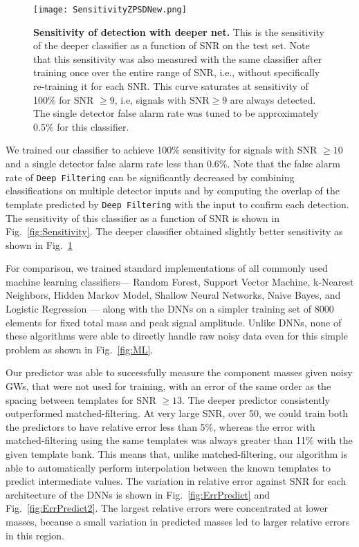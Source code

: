 \documentclass[aps,prd,%
amsmath,floats,floatfix, twocolumn, superscriptaddress,nofootinbib,showpacs]{revtex4-1}
\begin{document}
\begin{figure}
	
	\hspace{-.25in}	\texttt{[image: SensitivityZPSDNew.png]}
	
	\caption{\textbf{Sensitivity of detection with deeper net.} This is the sensitivity of the deeper classifier as a function of SNR on the test set. Note that this sensitivity was also measured with the same classifier after training once over the entire range of SNR, i.e., without specifically re-training it for each SNR. This curve saturates at sensitivity of 100\% for SNR $\ge 9$, i.e, signals with \(\textrm{SNR} \geq 9\) are always detected. The single detector false alarm rate was tuned to be approximately 0.5\% for this classifier. }
	\label{fig:SensitivityNew}
\end{figure}

We trained our classifier to achieve 100\% sensitivity for signals with SNR $\geq 10$ and a single detector false alarm rate less than 0.6\%. Note that the false alarm rate of \texttt{Deep Filtering} can be significantly decreased by combining classifications on multiple detector inputs and by computing the overlap of the template predicted by \texttt{Deep Filtering} with the input to confirm each detection. The sensitivity of this classifier as a function of SNR is shown in Fig.~\ref{fig:Sensitivity}. The deeper classifier obtained slightly better sensitivity as shown in Fig.~\ref{fig:SensitivityNew}


\noindent For comparison, we trained standard implementations of all commonly used machine learning classifiers--- Random Forest, Support Vector Machine, k-Nearest Neighbors, Hidden Markov Model, Shallow Neural Networks, Naive Bayes, and Logistic Regression --- along with the DNNs on a simpler training set of 8000 elements for fixed total mass and peak signal amplitude. Unlike DNNs, none of these algorithms were able to directly handle raw noisy data even for this simple problem as shown in Fig.~\ref{fig:ML}.


\noindent Our predictor was able to successfully measure the component masses given noisy GWs, that were not used for training, with an error of the same order as the spacing between templates for SNR $\ge 13$. The deeper predictor consistently outperformed matched-filtering. At very large SNR, over 50, we could train both the predictors to have relative error less than 5\%, whereas the error with matched-filtering using the same templates was always greater than 11\% with the given template bank. This means that, unlike matched-filtering, our algorithm is able to automatically perform interpolation between the known templates to predict intermediate values. The variation in relative error against SNR for each architecture of the DNNs is shown in Fig.~\ref{fig:ErrPredict} and Fig.~\ref{fig:ErrPredict2}. The largest relative errors were concentrated at lower masses, because a small variation in predicted masses led to larger relative errors in this region.
\end{document}
